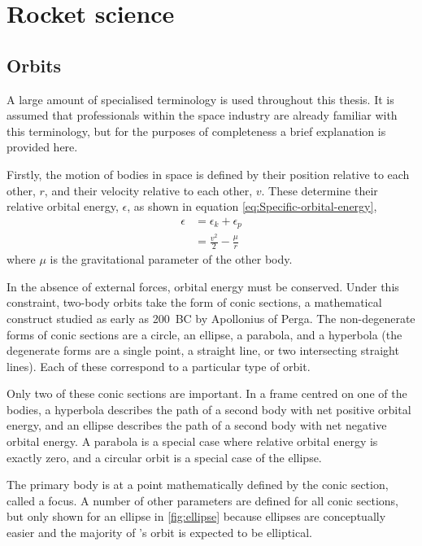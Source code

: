 \chapter{Rocket science} \label{cha:Rocket-science}

\section{Orbits} \label{sec:Orbits}

A large amount of specialised terminology is used throughout this thesis. It is assumed that professionals within the space industry are already familiar with this terminology, but for the purposes of completeness a brief explanation is provided here. 

Firstly, the motion of bodies in space is defined by their position relative to each other, $r$, and their velocity relative to each other, $v$. These determine their relative orbital energy, $\epsilon$, as shown in equation \eqref{eq:Specific-orbital-energy}, %
\begin{subequations} \label{eq:Specific-orbital-energy}
\begin{align} 
\epsilon &= \epsilon_k + \epsilon_p \\
&= \frac{v^2}{2} - \frac{\mu}{r}
\end{align}
\end{subequations}
where $\mu$ is the gravitational parameter of the other body.

In the absence of external forces, orbital energy must be conserved. Under this constraint, two-body orbits take the form of conic sections, a mathematical construct studied as early as 200~BC by Apollonius of Perga. The non-degenerate forms of conic sections are a circle, an ellipse, a parabola, and a hyperbola (the degenerate forms are a single point, a straight line, or two intersecting straight lines). Each of these correspond to a particular type of orbit. 

Only two of these conic sections are important. In a frame centred on one of the bodies, a hyperbola describes the path of a second body with net positive orbital energy, and an ellipse describes the path of a second body with net negative orbital energy. A parabola is a special case where relative orbital energy is exactly zero, and a circular orbit is a special case of the ellipse. 

The primary body is at a point mathematically defined by the conic section, called a focus. A number of other parameters are defined for all conic sections, but only shown for an ellipse in \autoref{fig:ellipse} because ellipses are conceptually easier and the majority of \BW's orbit is expected to be elliptical.

